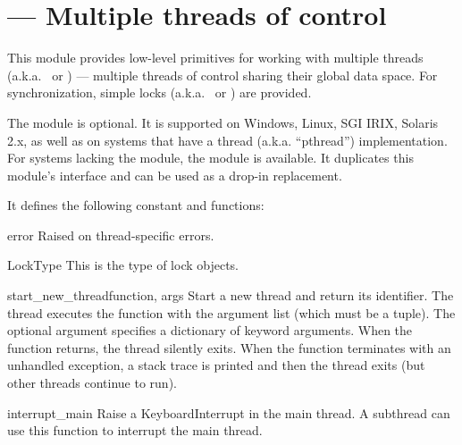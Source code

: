 \section{ ---
         Multiple threads of control}



This module provides low-level primitives for working with multiple
threads (a.k.a.\  or ) --- multiple
threads of control sharing their global data space.  For
synchronization, simple locks (a.k.a.\  or ) are provided.

The module is optional.  It is supported on Windows, Linux, SGI
IRIX, Solaris 2.x, as well as on systems that have a \POSIX{} thread
(a.k.a. ``pthread'') implementation.  For systems lacking the 
module, the  module is available.
It duplicates this module's interface and can be
used as a drop-in replacement.

It defines the following constant and functions:

\begin{excdesc}{error}
Raised on thread-specific errors.
\end{excdesc}

\begin{datadesc}{LockType}
This is the type of lock objects.
\end{datadesc}

\begin{funcdesc}{start_new_thread}{function, args}
Start a new thread and return its identifier.  The thread executes the function
 with the argument list  (which must be a tuple).  The
optional  argument specifies a dictionary of keyword arguments.
When the function returns, the thread silently exits.  When the function
terminates with an unhandled exception, a stack trace is printed and
then the thread exits (but other threads continue to run).
\end{funcdesc}

\begin{funcdesc}{interrupt_main}{}
Raise a KeyboardInterrupt in the main thread.  A subthread can use this
function to interrupt the main thread.
\end{funcdesc}

